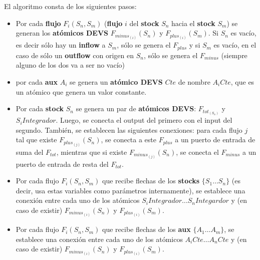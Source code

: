 El algoritmo consta de los siguientes pasos:
\begin{itemize}
	\item Por cada \textbf{flujo} $F_{i}(S_n,S_m)$ (\textbf{flujo} $i$ del \textbf{stock} $S_n$ hacia el \textbf{stock} $S_m$) se generan los \textbf{atómicos DEVS} $F_{minus_{(i)}}(S_n)$ y $F_{plus_{(i)}}(S_m)$. Si $S_n$ es vacío, es decir sólo hay un \textbf{inflow} a $S_m$, sólo se genera el $F_{plus}$ y si $S_m$ es vacío, en el caso de sólo un \textbf{outflow} con origen en $S_n$, sólo se genera el $F_{minus}$ (siempre alguno de los dos va a ser no vacío)

	\item por cada \textbf{aux} $A_i$ se genera un \textbf{atómico DEVS} $Cte$ de nombre $A_{i}Cte$, que es un atómico que genera un valor constante.

	\item Por cada \textbf{stock} $S_n$ se genera un par de \textbf{atómicos DEVS}: $F_{tot_{(S_n)}}$ y $S_{i}Integrador$. Luego, se conecta el output del primero con el input del segundo. También, se establecen las siguientes conexiones: para cada flujo $j$ tal que existe $F_{plus_{(j)}}(S_n)$, se conecta a este $F_{plus}$ a un puerto de entrada de suma del $F_{tot}$, mientras que si existe $F_{minus_{(j)}}(S_n)$, se conecta el $F_{minus}$ a un puerto de entrada de resta del $F_{tot}$.
	
	\item Por cada flujo $F_{i}(S_n,S_m)$ que recibe flechas de los \textbf{stocks} $\{ S_1 \dots S_n \}$ (es decir, usa estas variables como parámetros internamente), se establece una conexión entre cada uno de los atómicos $S_{i}Integrador \dots S_{n}Integardor$ y (en caso de existir) $F_{minus_{(i)}}(S_n)$ y $F_{plus_{(i)}}(S_m)$.

	\item Por cada flujo $F_{i}(S_n,S_m)$ que recibe flechas de los \textbf{aux} $\{ A_1 \dots A_m \}$, se establece una conexión entre cada uno de los atómicos $A_{i}Cte \dots A_{n}Cte$ y (en caso de existir) $F_{minus_{(i)}}(S_n)$ y $F_{plus_{(i)}}(S_m)$.

\end{itemize}

